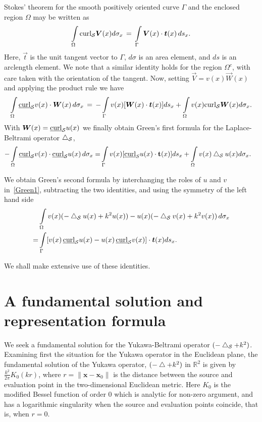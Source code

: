 Stokes' theorem for the  smooth positively oriented curve $\Gamma$ and
the enclosed region $\Omega$ may be written  as
\begin{align*}
  \int\limits_{\Omega} \mbox{curl}_{\S} \vec{V}(x) d\sigma_x \, = \,
  \int\limits_\Gamma \vec{V}(x) \cdot \vec{t}(x) \, ds_x .
\end{align*}
Here, $\vec{t}$ is the unit tangent vector to $\Gamma$, $d\sigma$ is an
area element, and $ds$ is an arclength element. We note that a similar
identity holds for the region $\Omega^{c}$, with care taken with the
orientation of the tangent.  Now, setting $\vec{V} = v(x) \vec{W}(x)$
and applying the product rule we have
\begin{align*}
  \int\limits_{\Omega} \underline{\mbox{curl}}_{\S} v(x) \cdot
  \vec{W}(x) \, d\sigma_x \, = \, 
  -\int\limits_{\Gamma} v(x) [\vec{W}(x) \cdot \vec{t}(x)] ds_x +
  \int\limits_{\Omega} v(x) \mbox{curl}_{\S} \vec{W}(x) d\sigma_x .
\end{align*}
With $\vec{W}(x) = \underline{\mbox{curl}}_{\S} u(x)$ we finally
obtain Green's first formula for the Laplace-Beltrami operator
$\bigtriangleup_{\mathcal{S}}$,
\begin{align}
  -\int\limits_{\Omega} \underline{\mbox{curl}}_{\mathcal{S}} v(x) \cdot
  \underline{\mbox{curl}}_{\mathcal{S}} u(x) \, d\sigma_x 
  =& \int\limits_{\Gamma} v(x) [\underline{\mbox{curl}}_S u(x) \cdot 
  \mathbf{t}(x)] ds_x +\int\limits_{\Omega} v(x) \bigtriangleup_{\mathcal{S}}u(x) d\sigma_x.
  \label{Green1}
\end{align}

We obtain Green's second formula by interchanging the roles of $u$ and
$v$ in~\eqref{Green1}, subtracting the two identities, and using the
symmetry of the left hand side
\begin{align*}
  &\int\limits_{\Omega} v(x)(-\lap_{\S}u(x) + k^2 u(x))-
  u(x)(-\lap_{\S}v(x) +k^2v(x))\, d\sigma_x \nonumber \\
  =&\int\limits_\Gamma [v(x)\,\underline{\mbox{curl}}_{\S} 
  u(x) - u(x)\, \underline{\mbox{curl}}_{\S}v(x)] \cdot 
  \vec{t}(x) ds_x.
\end{align*}

We shall make extensive use of these identities.


\section{A fundamental solution and representation formula}
We seek a fundamental solution for the Yukawa-Beltrami operator
$(-\bigtriangleup_{\mathcal{S}} + k^2)$.  Examining first the situation for the Yukawa
operator in the Euclidean plane, the fundamental solution of the Yukawa
operator, $(-\bigtriangleup + k^2)$ in $\mathbb{R}^2$ is given by
$\frac{k^2}{2\pi} K_{0}(kr)$, where $r=\|\mathbf{x} - \mathbf{x}_{0}\|$
is the distance between the source and evaluation point in the
two-dimensional Euclidean metric. Here $K_{0}$ is the modified Bessel
function of order 0 which is analytic for non-zero argument, and has a
logarithmic singularity when the source and evaluation points coincide,
that is, when $r=0$.

